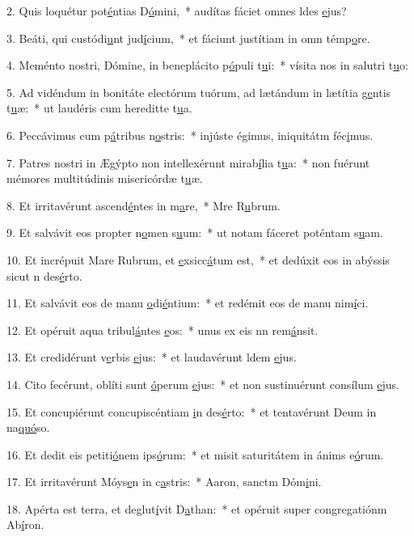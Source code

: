 2. Quis loquétur pot\uline{é}ntias D\uline{ó}mini,~* audítas fáciet omnes ldes \uline{e}jus?\par 
3. Beáti, qui custódi\uline{u}nt jud\uline{í}cium,~* et fáciunt justítiam in omn témp\uline{o}re.\par 
4. Meménto nostri, Dómine, in beneplácito p\uline{ó}puli t\uline{u}i:~* vísita nos in salutri t\uline{u}o:\par 
5. Ad vidéndum in bonitáte electórum tuórum, ad lætándum in lætítia g\uline{e}ntis t\uline{u}æ:~* ut laudéris cum hereditte t\uline{u}a.\par 
6. Peccávimus cum p\uline{á}tribus n\uline{o}stris:~* injúste égimus, iniquitátm féc\uline{i}mus.\par 
7. Patres nostri in Ægýpto non intellexérunt mirab\uline{í}lia t\uline{u}a:~* non fuérunt mémores multitúdinis misericórdæ t\uline{u}æ.\par 
8. Et irritavérunt ascend\uline{é}ntes in m\uline{a}re,~* Mre R\uline{u}brum.\par 
9. Et salvávit eos propter n\uline{o}men s\uline{u}um:~* ut notam fáceret poténtam s\uline{u}am.\par 
10. Et incrépuit Mare Rubrum, et \uline{e}xsicc\uline{á}tum est,~* et dedúxit eos in abýssis sicut n des\uline{é}rto.\par 
11. Et salvávit eos de manu \uline{o}di\uline{é}ntium:~* et redémit eos de manu nim\uline{í}ci.\par 
12. Et opéruit aqua tribul\uline{á}ntes \uline{e}os:~* unus ex eis nn rem\uline{á}nsit.\par 
13. Et credidérunt v\uline{e}rbis \uline{e}jus:~* et laudavérunt ldem \uline{e}jus.\par 
14. Cito fecérunt, oblíti sunt \uline{ó}perum \uline{e}jus:~* et non sustinuérunt consílum \uline{e}jus.\par 
15. Et concupiérunt concupiscéntiam \uline{i}n des\uline{é}rto:~* et tentavérunt Deum in na\uline{quó}so.\par 
16. Et dedit eis petiti\uline{ó}nem ips\uline{ó}rum:~* et misit saturitátem in ánims e\uline{ó}rum.\par 
17. Et irritavérunt Móys\uline{e}n in c\uline{a}stris:~* Aaron, sanctm Dóm\uline{i}ni.\par 
18. Apérta est terra, et deglut\uline{í}vit D\uline{a}than:~* et opéruit super congregatiónm Ab\uline{í}ron.\par 
